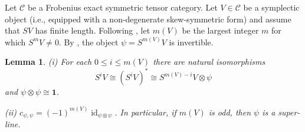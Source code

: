 \documentclass[12pt]{amsart}
\numberwithin{equation}{section}
\providecommand{\C}{}\renewcommand{\C}{\mathcal{C}}
\providecommand{\id}{}\renewcommand{\id}{\operatorname{id}}
\theoremstyle{plain}
\newtheorem{lemma}[theorem]{Lemma}
\theoremstyle{definition}
\theoremstyle{remark}
\begin{document}
Let $\C$ be a Frobenius exact symmetric tensor category. 
Let $V\in  \C$ be a symplectic object (i.e., equipped with a non-degenerate skew-symmetric form) 
and assume that $SV$ has finite length. Following \cite{CEN}, let $m(V)$ be the largest integer $m$ for which $S^mV\ne 0$. 
By \cite[Proposition~2.3.2]{CEN}, the object $\psi=S^{m(V)}V$ is invertible.

\begin{lemma}\label{psisq} (i) For each $0\le i\le m(V)$ there are natural isomorphisms 
$$
S^iV\cong (S^iV)^*\cong S^{m(V)-i}V\otimes \psi
$$ 
and $\psi\otimes \psi\cong {\mathbf 1}$. 

(ii) $c_{\psi,\psi}=(-1)^{m(V)}\id_{\psi\otimes \psi}$. In particular, if $m(V)$ is odd, then $\psi$ is a super-line. 
\end{lemma} 
 
\end{document}
